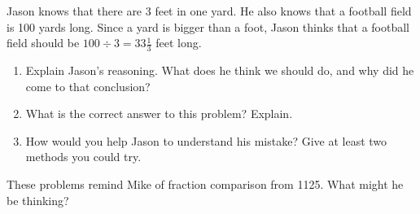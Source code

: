\documentclass[nooutcomes,noauthor, handout]{ximera}
\begin{document}
\begin{problem}
    Jason knows that there are 3 feet in one yard.  He also knows that a football field is 100 yards long.  Since a yard is bigger than a foot, Jason thinks that a football field should be $100 \div 3 = 33 \frac{1}{3}$ feet long.
    \begin{enumerate}
    \item Explain Jason's reasoning.  What does he think we should do, and why did he come to that conclusion?
    \item What is the correct answer to this problem? Explain.
    \item How would you help Jason to understand his mistake?  Give at least two methods you could try.
    \end{enumerate}
    
    
\end{problem} \vfill


\begin{problem}
These problems remind Mike of fraction comparison from 1125.  What might he be thinking?

\end{problem} \vfill
\end{document}
